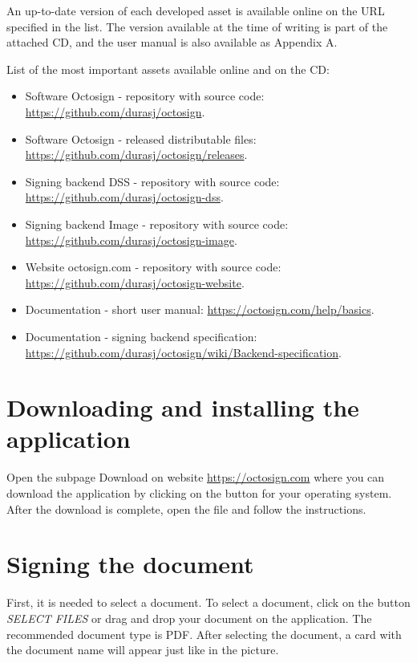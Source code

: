 \documentclass[thesismargins, english, thesislinespacing, onelinechapterstyle, upjsfrontpage]{rnthesis}
\begin{document}
\prilohy
An up-to-date version of each developed asset is available online on the URL specified in the list.
The version available at the time of writing is part of the attached CD, and the user manual is also available as Appendix A.

List of the most important assets available online and on the CD:

\begin{itemize}
  \item Software Octosign - repository with source code: \url{https://github.com/durasj/octosign}.
  \item Software Octosign - released distributable files: \url{https://github.com/durasj/octosign/releases}.
  \item Signing backend DSS - repository with source code: \url{https://github.com/durasj/octosign-dss}.
  \item Signing backend Image - repository with source code: \url{https://github.com/durasj/octosign-image}.
  \item Website octosign.com - repository with source code: \url{https://github.com/durasj/octosign-website}.
  \item Documentation - short user manual: \url{https://octosign.com/help/basics}.
  \item Documentation - signing backend specification: \url{https://github.com/durasj/octosign/wiki/Backend-specification}.
\end{itemize}


\section{Downloading and installing the application}

Open the subpage Download on website \url{https://octosign.com} where you can download the application by clicking on the button for your operating system.
After the download is complete, open the file and follow the instructions.

\section{Signing the document}

First, it is needed to select a document. To select a document, click on the button \textit{SELECT FILES} or drag and drop your document on the application.
The recommended document type is PDF.
After selecting the document, a card with the document name will appear just like in the picture.
\end{document}
